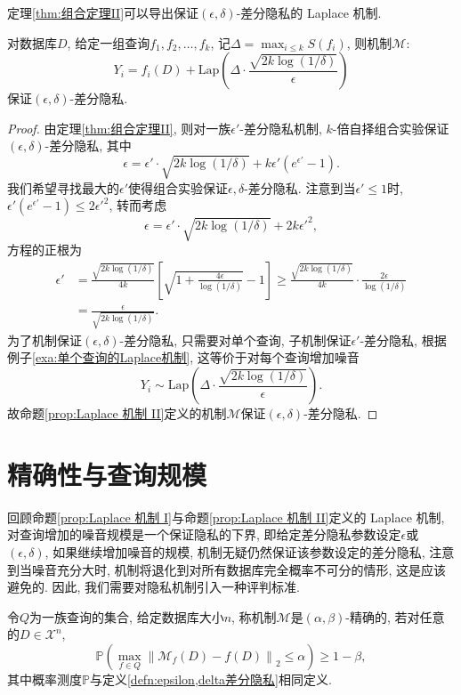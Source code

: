 定理\ref{thm:组合定理II}可以导出保证$(\epsilon, \delta)$-差分隐私的 Laplace 机制.

\begin{prop}[Laplace 机制 II]\label{prop:Laplace 机制 II}
  对数据库$D$, 给定一组查询$f_1, f_2, \dots, f_k$, 记$\Delta = \max_{i\le k} S(f_i)$, 则机制$\mathcal{M}$:
  \[
    Y_i = f_i(D) + \mathrm{Lap}\left(\Delta\cdot\frac{\sqrt{2k\log(1/\delta)}}{\epsilon}\right)
  \]
  保证$(\epsilon, \delta)$-差分隐私.
\end{prop}
\begin{proof}
  由定理\ref{thm:组合定理II}, 则对一族$\epsilon'$-差分隐私机制, $k$-倍自择组合实验保证$(\epsilon, \delta)$-差分隐私, 其中
  \[
    \epsilon = \epsilon'\cdot\sqrt{2k\log(1/\delta)} + k\epsilon'(e^{\epsilon'} - 1).
  \]
  我们希望寻找最大的$\epsilon'$使得组合实验保证$\epsilon, \delta$-差分隐私. 注意到当$\epsilon'\le1$时, $\epsilon'(e^{\epsilon'} - 1)\le2\epsilon'^2$, 转而考虑
  \[
    \epsilon = \epsilon'\cdot\sqrt{2k\log(1/\delta)} + 2k\epsilon'^2,
  \]
  方程的正根为
  \begin{align*}
    \epsilon' &= \frac{\sqrt{2k\log(1/\delta)}}{4k}\left[\sqrt{1 + \frac{4\epsilon}{\log(1/\delta)}} - 1\right] \ge \frac{\sqrt{2k\log(1/\delta)}}{4k}\cdot\frac{2\epsilon}{\log(1/\delta)} \\
    &= \frac{\epsilon}{\sqrt{2k\log(1/\delta)}}.
  \end{align*}
  为了机制保证$(\epsilon, \delta)$-差分隐私, 只需要对单个查询, 子机制保证$\epsilon'$-差分隐私, 根据例子\ref{exa:单个查询的Laplace机制}, 这等价于对每个查询增加噪音
  \[
    Y_i \sim \mathrm{Lap}\left(\Delta\cdot\frac{\sqrt{2k\log(1/\delta)}}{\epsilon}\right).
  \]
  故命题\ref{prop:Laplace 机制 II}定义的机制$\mathcal{M}$保证$(\epsilon, \delta)$-差分隐私.
\end{proof}

\section{精确性与查询规模} %
\label{sec:精确性与查询规模}
回顾命题\ref{prop:Laplace 机制 I}与命题\ref{prop:Laplace 机制 II}定义的 Laplace 机制, 对查询增加的噪音规模是一个保证隐私的下界, 即给定差分隐私参数设定$\epsilon$或$(\epsilon, \delta)$, 如果继续增加噪音的规模, 机制无疑仍然保证该参数设定的差分隐私, 注意到当噪音充分大时, 机制将退化到对所有数据库完全概率不可分的情形, 这是应该避免的. 因此, 我们需要对隐私机制引入一种评判标准.

\begin{defn}\label{defn:alpha,beta精确性}
  令$Q$为一族查询的集合, 给定数据库大小$n$, 称机制$\mathcal{M}$是$(\alpha, \beta)$-精确的, 若对任意的$D \in \mathcal{X}^n$, 
  \[
  \mathbb P\left(\max_{f\in Q} \left\| \mathcal{M}_f(D) - f(D)\right\|_2 \le \alpha\right) \ge 1 - \beta,
  \]
  其中概率测度$\mathbb P$与定义\ref{defn:epsilon,delta差分隐私}相同定义. 
\end{defn}

